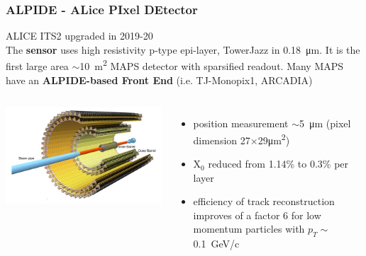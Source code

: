     \begin{frame}
        \frametitle{ALPIDE - ALice PIxel DEtector}
        ALICE ITS2 upgraded in 2019-20\\
        \smallskip
        The \textbf{sensor} uses high resistivity p-type epi-layer, TowerJazz in \SI{0.18}{\um}. It is the first large area $\sim$\SI{10}{m\squared} MAPS detector with sparsified readout.
        Many MAPS have an \textbf{ALPIDE-based Front End} (i.e. TJ-Monopix1, ARCADIA)
        \begin{columns}
                \includegraphics[width=1.3\linewidth]{figures/pixel_detectors_usage/alice.png}
            \begin{itemize}
                \item position measurement $\sim$\SI{5}{\um} (pixel dimension 27$\times$29\si{\um\squared})
                \item X$_0$ reduced from 1.14\% to 0.3\% per layer
                \item efficiency of track reconstruction improves of a factor 6 for low momentum particles with $p_T \sim$\SI{0.1}{GeV/c}
            \end{itemize}
        \end{columns}
    \end{frame} 